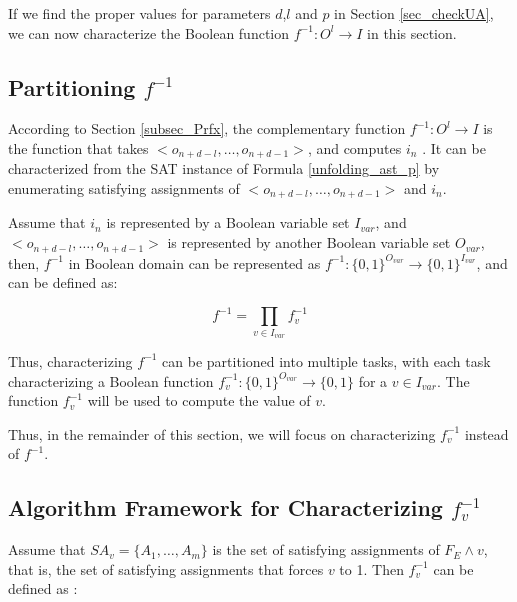 \documentclass[journal]{IEEEtran}
\begin{document}
If we find the proper values for parameters $d$,$l$ and $p$ in Section \ref{sec_checkUA},
we can now characterize the Boolean function $f^{-1}:O^l\to I$ in this section.

\subsection{Partitioning $f^{-1}$}

According to Section \ref{subsec_Prfx},
the complementary function $f^{-1}:O^l\to I$ is the function that takes $<o_{n+d-l},\dots , o_{n+d-1} >$,
and computes $i_n$ .
It can be characterized from the SAT instance of Formula \ref{unfolding_ast_p}
by enumerating satisfying assignments of $<o_{n+d-l},\dots , o_{n+d-1} >$ and $i_n$.

Assume that $i_n$ is represented by a Boolean variable set $I_{var}$,
and $<o_{n+d-l},\dots , o_{n+d-1} >$ is represented by another Boolean variable set $O_{var}$,
then,
$f^{-1}$ in Boolean domain can be represented as $f^{-1}:\{0,1\}^{O_{var}}\to \{0,1\}^{I_{var}}$,
and can be defined as:

\begin{equation}
f^{-1}= \prod _{v\in I_{var}} f_v^{-1}
\end{equation}

Thus,
characterizing $f^{-1}$ can be partitioned into multiple tasks,
with each task characterizing a Boolean function $f^{-1}_v: \{0,1\}^{O_{var}}\to \{0,1\}$ for a $v\in I_{var}$.
The function $f^{-1}_v$ will be used to compute the value of $v$.

Thus,
in the remainder of this section,
we will focus on characterizing $f^{-1}_v$ instead of $f^{-1}$.

\subsection{Algorithm Framework for Characterizing $f^{-1}_v$}\label{subsec_algframe}
%
Assume that $SA_v=\{A_1,\dots,A_m\}$ is the set of satisfying assignments of $F_E\wedge v$,
that is,
the set of satisfying assignments that forces $v$ to 1.
Then $f^{-1}_v$ can be defined as :
\end{document}
